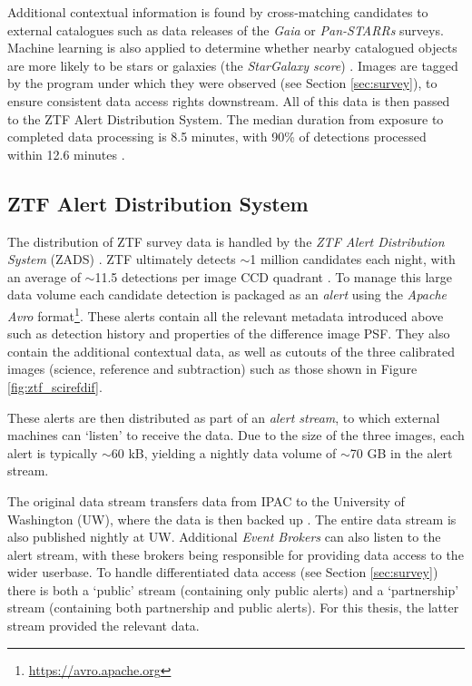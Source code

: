 Additional contextual information is found by cross-matching candidates to external catalogues such as data releases of the \emph{Gaia} or \emph{Pan-STARRs} surveys. Machine learning is also applied to determine whether nearby catalogued objects are more likely to be stars or galaxies (the \emph{StarGalaxy score}) . Images are tagged by the program under which they were observed (see Section \ref{sec:survey}), to ensure consistent data access rights downstream. All of this data is then passed to the ZTF Alert Distribution System. The median duration from exposure to completed data processing is 8.5 minutes, with 90\% of detections processed within 12.6 minutes \cite{ztf_data_processing}.

\subsection*{ZTF Alert Distribution System}

The distribution of ZTF survey data is handled by the \emph{ZTF Alert Distribution System} (ZADS) . ZTF ultimately detects $\sim$1 million candidates each night, with an average of $\sim$11.5 detections per image CCD quadrant \cite{ztf_data_processing}. To manage this large data volume each candidate detection is packaged as an \emph{alert} using the \emph{Apache Avro} format\footnote{\url{https://avro.apache.org}}. These alerts contain all the relevant metadata introduced above such as detection history and properties of the difference image PSF. They also contain the additional contextual data, as well as cutouts of the three calibrated images (science, reference and subtraction) such as those shown in Figure \ref{fig:ztf_scirefdif}.

 These alerts are then distributed as part of an \emph{alert stream}, to which external machines can `listen' to receive the data. Due to the size of the three images, each alert is typically $\sim$60 kB, yielding a nightly data volume of $\sim$70 GB in the alert stream.  

The original data stream transfers data from IPAC to the University of Washington (UW), where the data is then backed up \cite{zads_19}. The entire data stream is also published nightly at UW. Additional \emph{Event Brokers} can also listen to the alert stream, with these brokers being responsible for providing data access to the wider userbase. To handle differentiated data access (see Section \ref{sec:survey}) there is both a `public' stream (containing only public alerts)  and a  `partnership' stream (containing both partnership and public alerts). For this thesis, the latter stream provided the relevant data.

